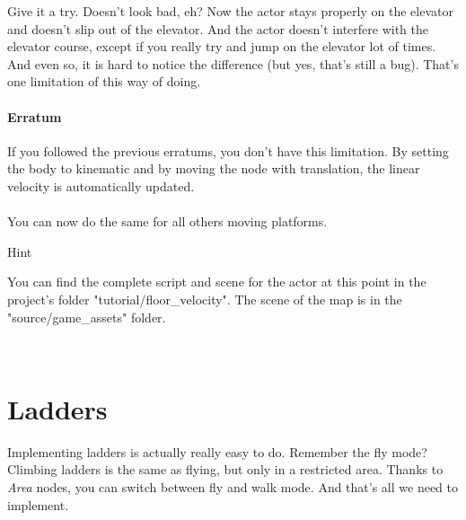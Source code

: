 \documentclass[10pt,a4paper]{article}
\newenvironment{hint}{%
\begin{bclogo}[logo=\bcinfo, couleurBarre=Green, noborder=true, 
               couleur=white]{Hint}
}{%
\end{bclogo}\hspace{1px}\\
}
\begin{document}
Give it a try. Doesn't look bad, eh? Now the actor stays properly on the elevator and doesn't slip out of the elevator. And the actor doesn't interfere with the elevator course, except if you really try and jump on the elevator lot of times. And even so, it is hard to notice the difference (but yes, that's still a bug). That's one limitation of this way of doing. 
\paragraph{Erratum}
If you followed the previous erratums, you don't have this limitation. By setting the body to kinematic and by moving the node with translation, the linear velocity is automatically updated.\\
\\
You can now do the same for all others moving platforms.

\begin{hint}
You can find the complete script and scene for the actor at this point in the project's folder "tutorial/floor\_velocity". The scene of the map is in the "source/game\_assets" folder.
\end{hint}

\section{Ladders}
Implementing ladders is actually really easy to do. Remember the fly mode? Climbing ladders is the same as flying, but only in a restricted area. Thanks to \textit{Area} nodes, you can switch between fly and walk mode. And that's all we need to implement.
\end{document}
